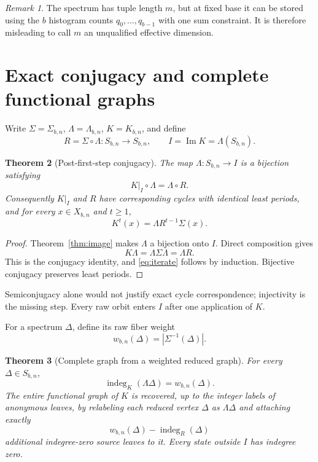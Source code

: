 \documentclass[11pt]{article}
\newtheorem{theorem}{Theorem}[section]
\theoremstyle{definition}
\theoremstyle{remark}
\newtheorem{remark}[theorem]{Remark}
\newcommand{\1}{\mathbf{1}}
\newcommand{\indeg}{\operatorname{indeg}}
\DeclareMathOperator{\ImMap}{Im}
\begin{document}
\begin{remark}
The spectrum has tuple length $m$, but at fixed base it can be stored using the
$b$ histogram counts $q_0,\ldots,q_{b-1}$ with one sum constraint.  It is
therefore misleading to call $m$ an unqualified effective dimension.
\end{remark}

\section{Exact conjugacy and complete functional graphs}

Write $\Sigma=\Sigma_{b,n}$, $\Lambda=\Lambda_{b,n}$, $K=K_{b,n}$, and define
\[
  R=\Sigma\circ\Lambda:S_{b,n}\to S_{b,n},
  \qquad I=\ImMap K=\Lambda(S_{b,n}).
\]

\begin{theorem}[Post-first-step conjugacy]\label{thm:conjugacy}
The map $\Lambda:S_{b,n}\to I$ is a bijection satisfying
\[
  K|_I\circ\Lambda=\Lambda\circ R.
\]
Consequently $K|_I$ and $R$ have corresponding cycles with identical least
periods, and for every $x\in X_{b,n}$ and $t\geq1$,
\begin{equation}\label{eq:iterate}
  K^t(x)=\Lambda R^{t-1}\Sigma(x).
\end{equation}
\end{theorem}

\begin{proof}
Theorem~\ref{thm:image} makes $\Lambda$ a bijection onto $I$.  Direct
composition gives
\[
 K\Lambda=\Lambda\Sigma\Lambda=\Lambda R.
\]
This is the conjugacy identity, and \eqref{eq:iterate} follows by induction.
Bijective conjugacy preserves least periods.
\end{proof}

Semiconjugacy alone would not justify exact cycle correspondence; injectivity
is the missing step.  Every raw orbit enters $I$ after one application of $K$.

For a spectrum $\Delta$, define its raw fiber weight
\[
  w_{b,n}(\Delta)=|\Sigma^{-1}(\Delta)|.
\]

\begin{theorem}[Complete graph from a weighted reduced graph]
\label{thm:full-graph}
For every $\Delta\in S_{b,n}$,
\[
  \indeg_K(\Lambda\Delta)=w_{b,n}(\Delta).
\]
The entire functional graph of $K$ is recovered, up to the integer labels of
anonymous leaves, by relabeling each reduced vertex $\Delta$ as
$\Lambda\Delta$ and attaching exactly
\[
  w_{b,n}(\Delta)-\indeg_R(\Delta)
\]
additional indegree-zero source leaves to it.  Every state outside $I$ has
indegree zero.
\end{theorem}
\end{document}
